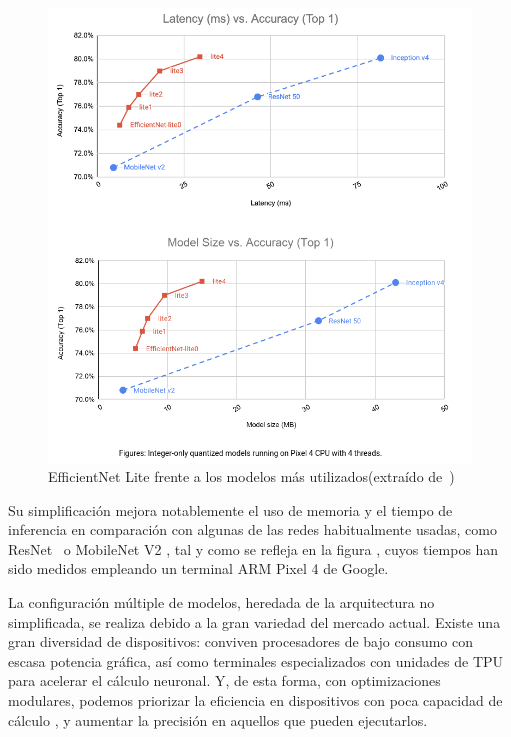 \begin{figure}[H]

	\centering
	\includegraphics[scale = 0.325]{imagenes/eflite.png}
	\caption{EfficientNet Lite frente a los modelos más utilizados(extraído de~\cite{eflite2})}
		\label{eflite}
\end{figure}

Su simplificación mejora notablemente el uso de memoria y el tiempo de inferencia en comparación con algunas de las redes habitualmente usadas, como ResNet~\cite{he2015deep} o MobileNet V2 \cite{sandler2019mobilenetv2}, tal y como se refleja en la figura \cite{eflite}, cuyos tiempos han sido medidos empleando un terminal ARM Pixel 4 de Google.

La configuración múltiple de modelos, heredada de la arquitectura no simplificada, se realiza debido a la gran variedad del mercado actual. Existe una gran diversidad de  dispositivos: conviven procesadores de bajo consumo con escasa potencia gráfica, así como terminales especializados con unidades de TPU para acelerar el cálculo neuronal. Y, de esta forma, con optimizaciones modulares, podemos priorizar la eficiencia en dispositivos con poca capacidad de cálculo , y aumentar la precisión en aquellos que pueden ejecutarlos.

